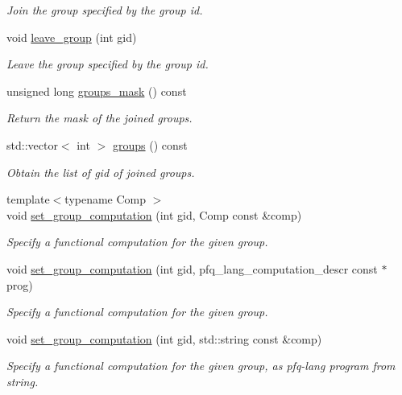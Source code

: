 \begin{DoxyCompactItemize}
\begin{DoxyCompactList}\small\item\em Join the group specified by the group id. \end{DoxyCompactList}\item 
void \hyperlink{classpfq_1_1socket_ac512d6b89db52da73a51ba9112658180}{leave\+\_\+group} (int gid)
\begin{DoxyCompactList}\small\item\em Leave the group specified by the group id. \end{DoxyCompactList}\item 
unsigned long \hyperlink{classpfq_1_1socket_a136c71dc2292218fe43246770cf109da}{groups\+\_\+mask} () const
\begin{DoxyCompactList}\small\item\em Return the mask of the joined groups. \end{DoxyCompactList}\item 
std\+::vector$<$ int $>$ \hyperlink{classpfq_1_1socket_a6b850a0f5acec17e153c16cdfca16d52}{groups} () const
\begin{DoxyCompactList}\small\item\em Obtain the list of gid of joined groups. \end{DoxyCompactList}\item 
{\footnotesize template$<$typename Comp $>$ }\\void \hyperlink{classpfq_1_1socket_a5cb37765ffcb1b78c5d61211f9e806df}{set\+\_\+group\+\_\+computation} (int gid, Comp const \&comp)
\begin{DoxyCompactList}\small\item\em Specify a functional computation for the given group. \end{DoxyCompactList}\item 
void \hyperlink{classpfq_1_1socket_a5f0ff8e78f374974ae32753c313e931c}{set\+\_\+group\+\_\+computation} (int gid, pfq\+\_\+lang\+\_\+computation\+\_\+descr const $\ast$prog)
\begin{DoxyCompactList}\small\item\em Specify a functional computation for the given group. \end{DoxyCompactList}\item 
void \hyperlink{classpfq_1_1socket_aa326867f9a3ca1391158161ff54d564c}{set\+\_\+group\+\_\+computation} (int gid, std\+::string const \&comp)
\begin{DoxyCompactList}\small\item\em Specify a functional computation for the given group, as pfq-\/lang program from string. \end{DoxyCompactList}\item 

\end{DoxyCompactItemize}
